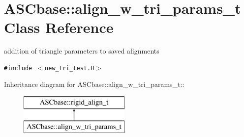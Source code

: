 \section{ASCbase::align\_\-w\_\-tri\_\-params\_\-t Class Reference}
\label{classASCbase_1_1align__w__tri__params__t}
addition of triangle parameters to saved alignments  


{\tt \#include $<$new\_\-tri\_\-test.H$>$}

Inheritance diagram for ASCbase::align\_\-w\_\-tri\_\-params\_\-t::\begin{figure}[H]
\begin{center}
\leavevmode
\includegraphics[height=2cm]{classASCbase_1_1align__w__tri__params__t}
\end{center}
\end{figure}
